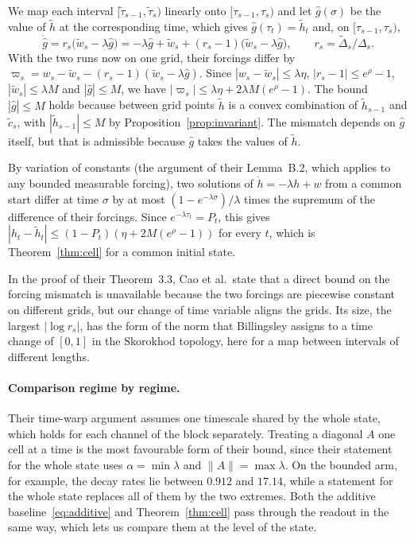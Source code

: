\documentclass[11pt, a4paper]{article}
\theoremstyle{remark}
\theoremstyle{plain}
\begin{document}
We map each interval $[\tilde\tau_{s-1}, \tilde\tau_s)$ linearly onto $[\tau_{s-1}, \tau_s)$ and
let $\hat g(\sigma)$ be the value of $\tilde h$ at the corresponding time, which gives
$\hat g(\tau_t) = \tilde h_t$ and, on $[\tau_{s-1}, \tau_s)$,
\[
  \dot{\hat g} = r_s\bigl(\tilde w_s - \lambda\hat g\bigr)
    = -\lambda\hat g + \tilde w_s + (r_s - 1)\bigl(\tilde w_s - \lambda\hat g\bigr),
  \qquad r_s = \tilde\Delta_s/\Delta_s .
\]
With the two runs now on one grid, their forcings differ by
$\varpi_s = w_s - \tilde w_s - (r_s - 1)(\tilde w_s - \lambda\hat g)$. Since
$|w_s - \tilde w_s| \le \lambda\eta$, $|r_s - 1| \le e^{\rho} - 1$, $|\tilde w_s| \le \lambda M$ and
$|\hat g| \le M$, we have
$|\varpi_s| \le \lambda\eta + 2\lambda M(e^{\rho} - 1)$. The bound $|\hat g| \le M$ holds because
between grid points $\tilde h$ is a convex combination of $\tilde h_{s-1}$ and $\tilde c_s$, with
$|\tilde h_{s-1}| \le M$ by Proposition~\ref{prop:invariant}. The mismatch depends on $\hat g$
itself, but that is admissible because $\hat g$ takes the values of $\tilde h$.

By variation of constants (the argument of their Lemma~B.2, which applies to any bounded
measurable forcing), two solutions of $\dot h = -\lambda h + w$ from a common start differ at time
$\sigma$ by at most $(1 - e^{-\lambda\sigma})/\lambda$ times the supremum of the difference of
their forcings. Since $e^{-\lambda\tau_t} = P_t$, this gives
$|h_t - \tilde h_t| \le (1 - P_t)(\eta + 2M(e^{\rho} - 1))$ for every $t$, which is
Theorem~\ref{thm:cell} for a common initial state.

In the proof of their Theorem~3.3, Cao et al.\ state that a direct bound on the forcing mismatch is
unavailable because the two forcings are piecewise constant on different grids, but our change of
time variable aligns the grids. Its size, the largest $|\log r_s|$, has the form of the norm that
Billingsley \citep[Section~12]{billingsley1999convergence} assigns to a time change of $[0, 1]$ in
the Skorokhod topology, here for a map between intervals of different lengths.

\paragraph{Comparison regime by regime.}
Their time-warp argument assumes one timescale shared by the whole state, which holds for each
channel of the block separately. Treating a diagonal $A$ one cell at a time is the most
favourable form of their bound, since their statement for the whole state uses
$\alpha = \min\lambda$ and $\|A\| = \max\lambda$. On the bounded arm, for example, the decay rates lie
between $0.912$ and $17.14$, while a statement for the whole state replaces all of them by the two
extremes. Both the additive baseline~\eqref{eq:additive} and
Theorem~\ref{thm:cell} pass through the readout in the same way, which lets us compare them at the
level of the state.
\end{document}
